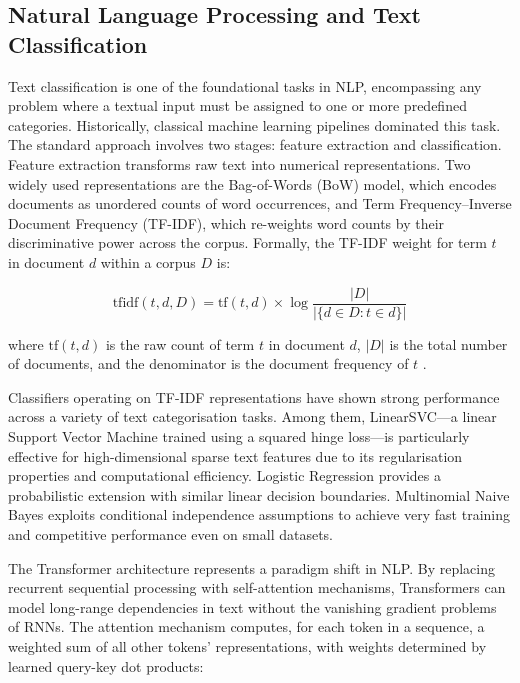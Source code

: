 \documentclass[12pt,a4paper]{article}
\begin{document}
\subsection{Natural Language Processing and Text Classification}
\label{subsec:nlp_background}

Text classification is one of the foundational tasks in NLP, encompassing any problem where a textual input must be assigned to one or more predefined categories. Historically, classical machine learning pipelines dominated this task. The standard approach involves two stages: feature extraction and classification. Feature extraction transforms raw text into numerical representations. Two widely used representations are the Bag-of-Words (BoW) model, which encodes documents as unordered counts of word occurrences, and Term Frequency--Inverse Document Frequency (TF-IDF), which re-weights word counts by their discriminative power across the corpus. Formally, the TF-IDF weight for term $t$ in document $d$ within a corpus $D$ is:

\begin{equation}
    \text{tfidf}(t, d, D) = \text{tf}(t, d) \times \log\frac{|D|}{|\{d \in D : t \in d\}|}
    \label{eq:tfidf}
\end{equation}

where $\text{tf}(t, d)$ is the raw count of term $t$ in document $d$, $|D|$ is the total number of documents, and the denominator is the document frequency of $t$ \citep{pedregosa2011scikit}.

Classifiers operating on TF-IDF representations have shown strong performance across a variety of text categorisation tasks. Among them, LinearSVC---a linear Support Vector Machine trained using a squared hinge loss---is particularly effective for high-dimensional sparse text features due to its regularisation properties and computational efficiency. Logistic Regression provides a probabilistic extension with similar linear decision boundaries. Multinomial Naive Bayes exploits conditional independence assumptions to achieve very fast training and competitive performance even on small datasets.

The Transformer architecture \citep{vaswani2017attention} represents a paradigm shift in NLP. By replacing recurrent sequential processing with self-attention mechanisms, Transformers can model long-range dependencies in text without the vanishing gradient problems of RNNs. The attention mechanism computes, for each token in a sequence, a weighted sum of all other tokens' representations, with weights determined by learned query-key dot products:
\end{document}
